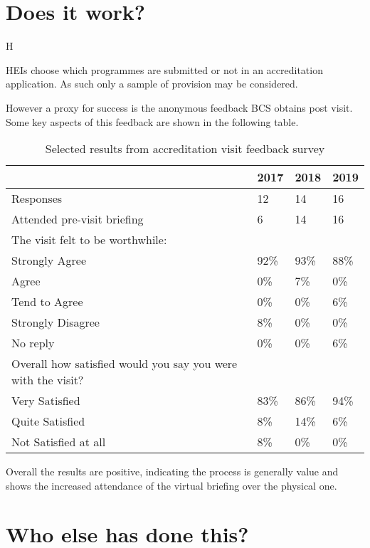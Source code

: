 \documentclass[sigconf]{acmart}
\begin{document}
\section {Does it work?}	H

HEIs choose which programmes are submitted or not in an accreditation application. As such only a sample of provision may be considered.

However a proxy for success is the anonymous feedback BCS obtains post visit. Some key aspects of this feedback are shown in the following table.

\begin{table}[h!]
  \caption{Selected results from accreditation visit feedback survey}
  \label{table:1}
\begin{tabular}{ | p{5cm}|p{.75cm}|p{.75cm} |p{.75cm} |}
\hline
 & 2017 & 2018 & 2019   \\ \hline
Responses & 12 & 14 & 16   \\
\hline
Attended pre-visit briefing & 6 & 14 & 16   \\
\hline
The visit felt to be worthwhile: & & &  \\
Strongly Agree &92\% & 93\% &88\% \\
Agree &0\% & 7\% &0\% \\
Tend to Agree &0\% & 0\% &6\% \\
Strongly Disagree &8\% & 0\% &0\% \\
No reply &0\% & 0\% &6\% \\
\hline
Overall how satisfied  would you say you were with the visit? & & &  \\
Very Satisfied &83\% & 86\% &94\% \\
Quite Satisfied &8\% & 14\% &6\% \\
Not Satisfied at all &8\% & 0\% &0\% \\
\hline

\end{tabular}%
\end{table}

Overall the results are positive, indicating the process is generally value and shows the increased attendance of the virtual briefing over the physical one.

\section {Who else has done this?}	
\end{document}
